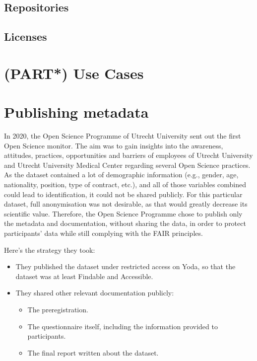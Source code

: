 \documentclass[
]{book}
\providecommand{\tightlist}{%
  \setlength{\itemsep}{0pt}\setlength{\parskip}{0pt}}
\begin{document}
\hypertarget{repositories}{%
\section{Repositories}\label{repositories}}

\hypertarget{licenses}{%
\section{Licenses}\label{licenses}}

\hypertarget{part-use-cases}{%
\chapter{(PART*) Use Cases}\label{part-use-cases}}

\hypertarget{open-science-questionnaire}{%
\chapter{Publishing metadata}\label{open-science-questionnaire}}

In 2020, the
Open
Science Programme of Utrecht University sent out the first
Open Science monitor. The aim was to gain insights into the awareness,
attitudes, practices, opportunities and barriers of employees of Utrecht
University and Utrecht University Medical Center regarding several Open
Science practices. As the dataset contained a lot of demographic information
(e.g., gender, age, nationality, position, type of contract, etc.), and all of
those variables combined could lead to identification, it could not be shared
publicly. For this particular dataset, full anonymisation was not desirable,
as that would greatly decrease its scientific value. Therefore, the Open Science
Programme chose to publish only the metadata and documentation, without sharing
the data, in order to protect participants' data while still complying with the
FAIR principles.

Here's the strategy they took:

\begin{itemize}
\tightlist
\item
  They published the dataset under
  restricted
  access on Yoda, so that the dataset was at least Findable and Accessible.
\item
  They shared other relevant documentation publicly:

  \begin{itemize}
  \tightlist
  \item
    The preregistration.
  \item
    The questionnaire itself,
    including the information provided to participants.
  \item
    The final report
    written about the dataset.
  \end{itemize}
\end{itemize}
\end{document}
